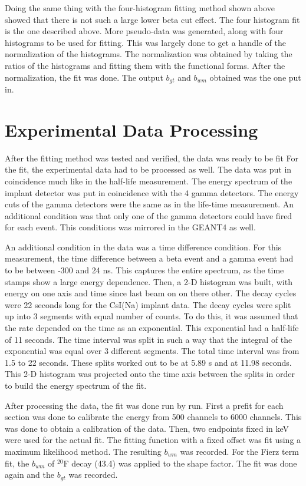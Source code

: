 \documentclass[main.tex]{subfiles}
\begin{document}
Doing the same thing with the four-histogram fitting method shown above showed that there is not such a large lower beta cut effect.
The four histogram fit is the one described above. 
More pseudo-data was generated, along with four histograms to be used for fitting.
This was largely done to get a handle of the normalization of the histograms.
The normalization was obtained by taking the ratios of the histograms and fitting them with the functional forms. 
After the normalization, the fit was done.
The output $b_{gt}$ and $b_{wm}$ obtained was the one put in.

\section{Experimental Data Processing}
After the fitting method was tested and verified, the data was ready to be fit 
For the fit, the experimental data had to be processed as well. 
The data was put in coincidence much like in the half-life measurement.
The energy spectrum of the implant detector was put in coincidence with the 4 gamma detectors.
The energy cuts of the gamma detectors were the same as in the life-time measurement.
An additional condition was that only one of the gamma detectors could have fired for each event.
This conditions was mirrored in the GEANT4 as well.

An additional condition in the data was a time difference condition.
For this measurement, the time difference between a beta event and a gamma event had to be between -300 and 24 ns.
This captures the entire spectrum, as the time stamps show a large energy dependence. 
Then, a 2-D histogram was built, with energy on one axis and time since last beam on on there other.
The decay cycles were 22 seconds long for the CsI(Na) implant data. 
The decay cycles were split up into 3 segments with equal number of counts.
To do this, it was assumed that the rate depended on the time as an exponential.
This exponential had a half-life of 11 seconds.
The time interval was split in such a way that the integral of the exponential was equal over 3 different segments.
The total time interval was from 1.5 to 22 seconds.
These splits worked out to be at 5.89 s and at 11.98 seconds. 
This 2-D histogram was projected onto the time axis between the splits in order to build the energy spectrum of the fit. 

After processing the data, the fit was done run by run.
First a prefit for each section was done to calibrate the energy from 500 channels to 6000 channels.
This was done to obtain a calibration of the data.
Then, two endpoints fixed in keV were used for the actual fit.
The fitting function with a fixed offset was fit using a maximum likelihood method.
The resulting $b_{wm}$ was recorded.
For the Fierz term fit, the $b_{wm}$ of $^{20}$F decay (43.4) was applied to the shape factor.
The fit was done again and the $b_{gt}$ was recorded.
\end{document}
